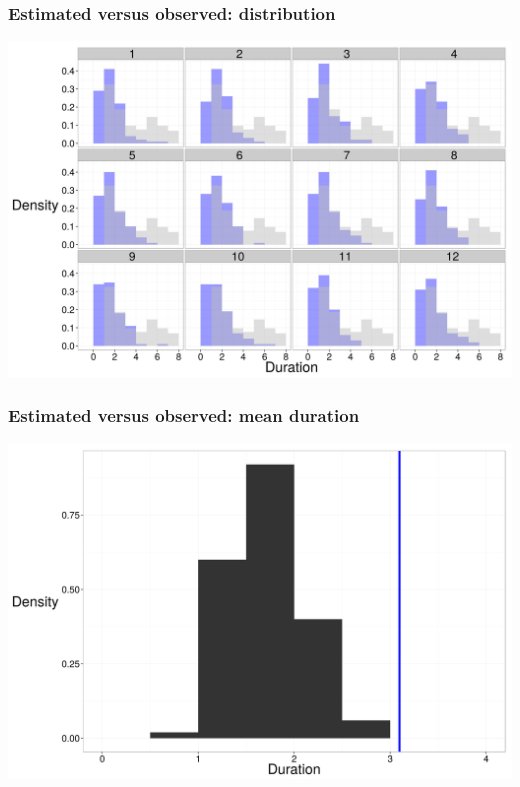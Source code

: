 \documentclass{beamer}
\begin{document}
\begin{frame}
  \frametitle{Estimated versus observed: distribution}
  \begin{center}
    \includegraphics[height = 0.8\textheight, width = \textwidth, keepaspectratio = true]{figure/wei_dur_post}
  \end{center}
\end{frame}

\begin{frame}
  \frametitle{Estimated versus observed: mean duration}
  \begin{center}
    \includegraphics[height = 0.8\textheight, width = \textwidth, keepaspectratio = true]{figure/wei_mean_ppc}
  \end{center}
\end{frame}
\end{document}
